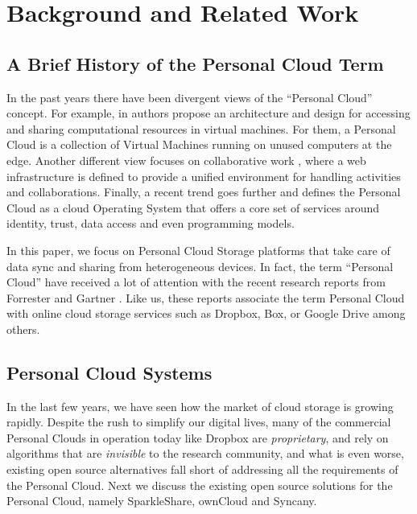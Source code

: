 \chapter{Background and Related Work}

\section{A Brief History of the Personal Cloud Term}

In the past years there have been divergent views of the ``Personal Cloud'' concept.  
For example, in \cite{hari2012personal} authors propose an architecture and design
for accessing and sharing computational resources in virtual machines. For them, a
Personal Cloud is a collection of Virtual Machines running on unused computers at the edge.
Another different view focuses on collaborative work \cite{ardissono2009service},  
where a web infrastructure is defined to provide a unified environment
for handling activities and collaborations. Finally, a recent trend \cite{windley}
 goes further and defines the Personal Cloud as a cloud Operating 
System that offers a core set of services around identity, trust, data access and 
even programming models.

In this paper, we focus on Personal Cloud Storage platforms that take care of data
sync and sharing from heterogeneous devices. In fact,  the term ``Personal Cloud'' have
received a lot of attention with the recent research reports from Forrester \cite{forrester}
and Gartner \cite{gartner}. Like us, these reports associate the term Personal Cloud with
online cloud storage services such as Dropbox, Box, or Google Drive among others.

\section{Personal Cloud Systems}

In the last few years, we have seen how the market of cloud storage is growing rapidly. 
Despite the rush to simplify our digital lives, many of the commercial Personal Clouds
in operation today like Dropbox are \textit{proprietary}, and rely on algorithms that are
\textit{invisible} to the research community, and what is even worse, existing open source
alternatives fall short of addressing all the requirements of the Personal Cloud.
Next we discuss the existing open source solutions for the Personal Cloud, namely
SparkleShare, ownCloud and Syncany.

